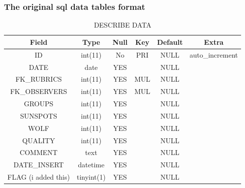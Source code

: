 \documentclass[12pt]{article}
\begin{document}
\subsubsection{The original sql data tables format}

\begin{table}[h!]
    \centering
    \caption{DESCRIBE DATA}
    \begin{tabular}{c|c|c|c|c|c}%
        \textbf{Field} & \textbf{Type} & \textbf{Null} & \textbf{Key} & \textbf{Default} & \textbf{Extra}  \\
        \hline
        ID & int(11) & No & PRI & NULL & auto\_increment \\
        
        DATE & date & YES && NULL & \\
        
        FK\_RUBRICS & int(11) & YES & MUL & NULL &  \\
        
        FK\_OBSERVERS & int(11) & YES & MUL & NULL &  \\
        
        GROUPS & int(11) & YES && NULL &  \\
        
        SUNSPOTS & int(11) & YES && NULL & \\
        
        WOLF & int(11) & YES && NULL &  \\
        
        QUALITY & int(11) & YES && NULL &  \\
        
        COMMENT & text & YES && NULL &  \\
        
        DATE\_INSERT & datetime & YES && NULL &  \\
        
        FLAG (i added this) & tinyint(1) & YES && NULL &  \\
        
    \end{tabular}
    \label{tab:data-og}
\end{table}
\end{document}
